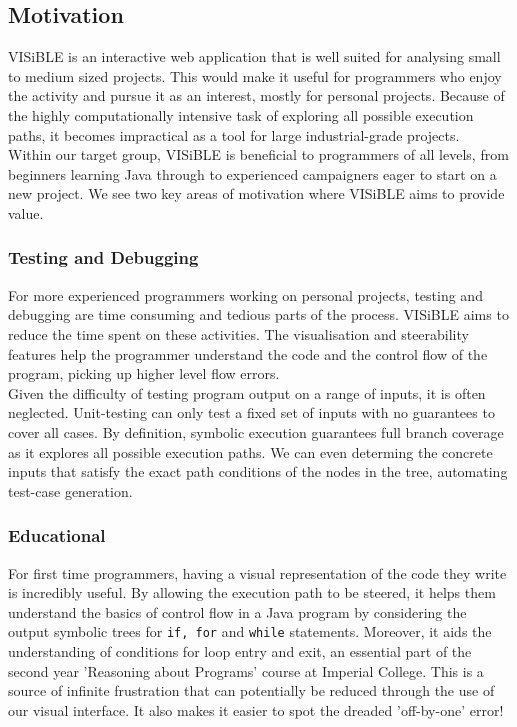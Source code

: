 \documentclass[titlepage,11pt]{article}
\begin{document}
\subsection{Motivation}
VISiBLE is an interactive web application that is well suited for analysing small to medium sized projects. This would make it useful for programmers who enjoy the activity and pursue it as an interest, mostly for personal projects. Because of the highly computationally intensive task of exploring all possible execution paths, it becomes impractical as a tool for large industrial-grade projects. \\

Within our target group, VISiBLE is beneficial to programmers of all levels, from beginners learning Java through to experienced campaigners eager to start on a new project. We see two key areas of motivation where VISiBLE aims to provide value.

\subsubsection{Testing and Debugging}
For more experienced programmers working on personal projects, testing and debugging are time consuming and tedious parts of the process. VISiBLE aims to reduce the time spent on these activities. The visualisation and steerability features help the programmer understand the code and the control flow of the program, picking up higher level flow errors. \\

Given the difficulty of testing program output on a range of inputs, it is often neglected. Unit-testing can only test a fixed set of inputs with no guarantees to cover all cases. By definition, symbolic execution guarantees full branch coverage as it explores all possible execution paths. We can even determing the concrete inputs that satisfy the exact path conditions of the nodes in the tree, automating test-case generation.

\subsubsection{Educational}
For first time programmers, having a visual representation of the code they write is incredibly useful. By allowing the execution path to be steered, it helps them understand the basics of control flow in a Java program by considering the output symbolic trees for \texttt{if, for} and \texttt{while} statements. Moreover, it aids the understanding of conditions for loop entry and exit, an essential part of the second year 'Reasoning about Programs' course at Imperial College. This is a source of infinite frustration that can potentially be reduced through the use of our visual interface. It also makes it easier to spot the dreaded 'off-by-one' error!
\end{document}
